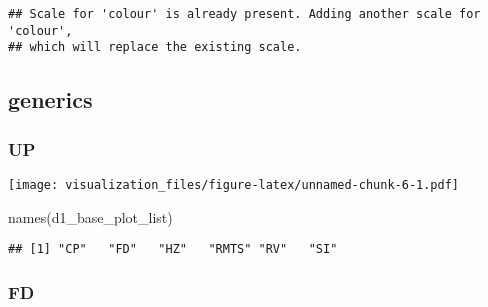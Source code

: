 \documentclass[
]{article}
\newenvironment{Shaded}{\begin{snugshade}}{\end{snugshade}}
\newcommand{\AttributeTok}[1]{\textcolor[rgb]{0.77,0.63,0.00}{#1}}
\newcommand{\FunctionTok}[1]{\textcolor[rgb]{0.00,0.00,0.00}{#1}}
\newcommand{\NormalTok}[1]{#1}
\newcommand{\OtherTok}[1]{\textcolor[rgb]{0.56,0.35,0.01}{#1}}
\newcommand{\SpecialCharTok}[1]{\textcolor[rgb]{0.00,0.00,0.00}{#1}}
\newcommand{\StringTok}[1]{\textcolor[rgb]{0.31,0.60,0.02}{#1}}
\begin{document}
\begin{verbatim}
## Scale for 'colour' is already present. Adding another scale for 'colour',
## which will replace the existing scale.
\end{verbatim}

\hypertarget{generics}{%
\subsection{generics}\label{generics}}

\hypertarget{up}{%
\subsubsection{UP}\label{up}}

\begin{Shaded}
\end{Shaded}

\texttt{[image: visualization\_files/figure-latex/unnamed-chunk-6-1.pdf]}

\begin{Shaded}
\begin{Highlighting}[]
\FunctionTok{names}\NormalTok{(d1\_base\_plot\_list)}
\end{Highlighting}
\end{Shaded}

\begin{verbatim}
## [1] "CP"   "FD"   "HZ"   "RMTS" "RV"   "SI"
\end{verbatim}

\hypertarget{fd}{%
\subsubsection{FD}\label{fd}}

\begin{Shaded}
\end{Shaded}
\end{document}

